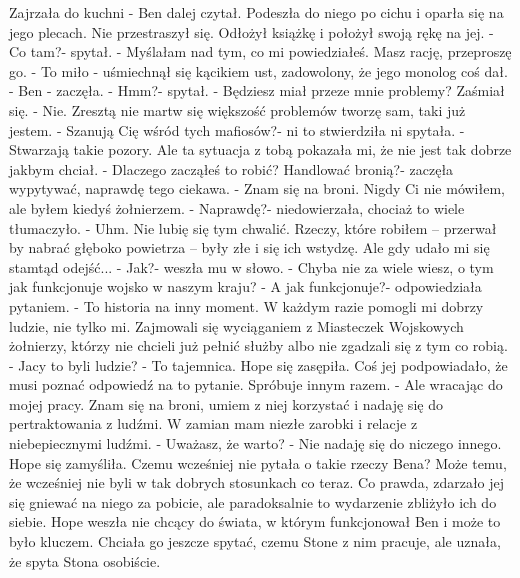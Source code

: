 \documentclass[12pt,a4paper]{book}
\begin{document}
Zajrzała do kuchni - Ben dalej czytał. Podeszła do niego po cichu i oparła się na jego plecach. Nie przestraszył się. Odłożył książkę i położył swoją rękę na jej. 
- Co tam?- spytał. 
- Myślałam nad tym, co mi powiedziałeś. Masz rację, przeproszę go. 
- To miło - uśmiechnął się kącikiem ust, zadowolony, że jego monolog coś dał.
- Ben - zaczęła. 
- Hmm?- spytał.
- Będziesz miał przeze mnie problemy? 
Zaśmiał się.
- Nie. Zresztą nie martw się większość problemów tworzę sam, taki już jestem. 
- Szanują Cię wśród tych mafiosów?- ni to stwierdziła ni spytała. 
- Stwarzają takie pozory. Ale ta sytuacja z tobą pokazała mi, że nie jest tak dobrze jakbym chciał. 
- Dlaczego zacząłeś to robić? Handlować bronią?- zaczęła wypytywać, naprawdę tego ciekawa. 
- Znam się na broni. Nigdy Ci nie mówiłem, ale byłem kiedyś żołnierzem.
- Naprawdę?- niedowierzała, chociaż to wiele tłumaczyło.
- Uhm. Nie lubię się tym chwalić. Rzeczy, które robiłem – przerwał by nabrać głęboko powietrza – były złe i się ich wstydzę. Ale gdy udało mi się stamtąd odejść...
- Jak?- weszła mu w słowo.
- Chyba nie za wiele wiesz, o tym jak funkcjonuje wojsko w naszym kraju?
- A jak funkcjonuje?- odpowiedziała pytaniem.
- To historia na inny moment. W każdym razie pomogli mi dobrzy ludzie, nie tylko mi. Zajmowali się wyciąganiem z Miasteczek Wojskowych żołnierzy, którzy nie chcieli już pełnić służby albo nie zgadzali się z tym co robią. 
- Jacy to byli ludzie?
- To tajemnica. 
Hope się zasępiła. Coś jej podpowiadało, że musi poznać odpowiedź na to pytanie. Spróbuje innym razem. 
- Ale wracając do mojej pracy. Znam się na broni, umiem z niej korzystać i nadaję się do pertraktowania z ludźmi. W zamian mam niezłe zarobki i relacje z niebepiecznymi ludźmi. 
- Uważasz, że warto?
- Nie nadaję się do niczego innego. 
Hope się zamyśliła. Czemu wcześniej nie pytała o takie rzeczy Bena? Może temu, że wcześniej nie byli w tak dobrych stosunkach co teraz. Co prawda, zdarzało jej się gniewać na niego za pobicie, ale paradoksalnie to wydarzenie zbliżyło ich do siebie. Hope weszła nie chcący do świata, w którym funkcjonował Ben i może to było kluczem. Chciała go jeszcze spytać, czemu Stone z nim pracuje, ale uznała, że spyta Stona osobiście.
\end{document}
